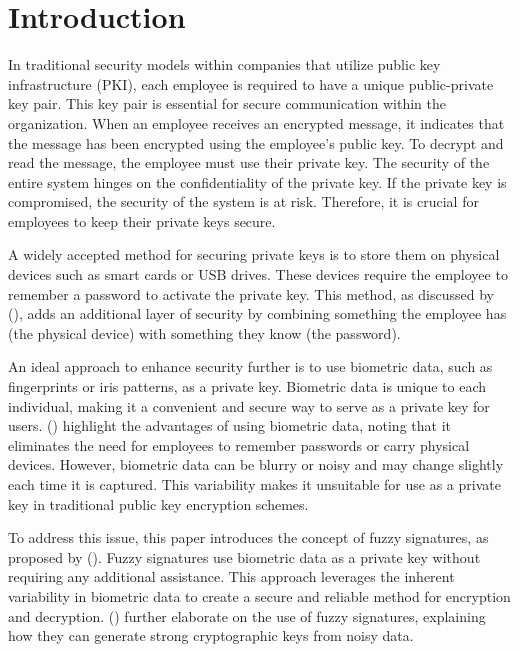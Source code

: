 \documentclass[graybox]{svmult}
\begin{document}

\section{Introduction}
In traditional security models within companies that utilize public key infrastructure (PKI),
each employee is required to have a unique public-private key pair. This key pair is
essential for secure communication within the organization. When an employee receives an
encrypted message, it indicates that the message has been encrypted using the employee’s
public key. To decrypt and read the message, the employee must use their private key.
The security of the entire system hinges on the confidentiality of the private key.
If the private key is compromised, the security of the system is at risk.
Therefore, it is crucial for employees to keep their private keys secure.

A widely accepted method for securing private keys is to store them on physical devices
such as smart cards or USB drives. These devices require the employee to remember a
password to activate the private key. This method, as discussed by \citeauthor{Ellison2000} (\citeyear{Ellison2000}),
adds an additional layer of security by combining something the employee has
(the physical device) with something they know (the password).

An ideal approach to enhance security further is to use biometric data,
such as fingerprints or iris patterns, as a private key.
Biometric data is unique to each individual, making it a convenient and secure way to
serve as a private key for users. \citeauthor{Connaughton2007} (\citeyear{Connaughton2007})
highlight the advantages of using biometric data, noting that it eliminates the need for
employees to remember passwords or carry physical devices. However, biometric data can be
blurry or noisy and may change slightly each time it is captured. This variability makes
it unsuitable for use as a private key in traditional public key encryption schemes.

To address this issue, this paper introduces the concept of fuzzy signatures, as proposed by
\citeauthor{Takahashi2015} (\citeyear{Takahashi2015}). Fuzzy signatures use biometric data
as a private key without requiring any additional assistance. This approach leverages the
inherent variability in biometric data to create a secure and reliable method for encryption
and decryption. \citeauthor{Dodis2008} (\citeyear{Dodis2008}) further elaborate on the use of fuzzy signatures, explaining how they can generate strong cryptographic keys from noisy data.
\end{document}
